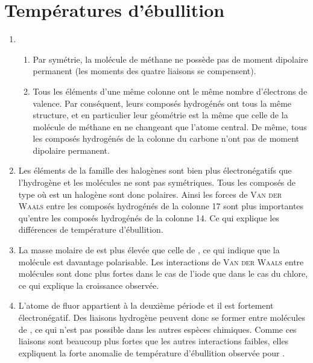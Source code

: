 \documentclass[a4paper, 12pt, final, garamond]{book}
\begin{document}
\section{Températures d'ébullition}
\begin{enumerate}
    \item 
        \begin{enumerate}
            \item Par symétrie, la molécule de méthane ne possède pas de moment
                dipolaire permanent (les moments des quatre liaisons  se
                compensent).
            \item Tous les éléments d'une même colonne ont le même nombre
                d'électrons de valence. Par conséquent, leurs composés
                hydrogénés ont tous la même structure, et en particulier leur
                géométrie est la même que celle de la molécule de méthane en ne
                changeant que l'atome central. De même, tous les composés
                hydrogénés de la colonne du carbone n'ont pas de moment
                dipolaire permanent.
        \end{enumerate}
    \item Les éléments de la famille des halogènes sont bien plus
        électronégatifs que l'hydrogène et les molécules ne sont pas
        symétriques. Tous les composés de type  où  est un
        halogène sont donc polaires. Ainsi les forces de \textsc{Van der Waals}
        entre les composés hydrogénés de la colonne 17 sont plus importantes
        qu'entre les composés hydrogénés de la colonne 14. Ce qui explique les
        différences de température d'ébullition.
    \item La masse molaire de  est plus élevée que celle de , ce
        qui indique que la molécule est davantage polarisable. Les interactions
        de \textsc{Van der Waals} entre molécules sont donc plus fortes dans le
        cas de l'iode que dans le cas du chlore, ce qui explique la croissance
        observée.
    \item L'atome de fluor appartient à la deuxième période et il est fortement
        électronégatif. Des liaisons hydrogène peuvent donc se former entre
        molécules de , ce qui n'est pas possible dans les autres espèces
        chimiques. Comme ces liaisons sont beaucoup plus fortes que les autres
        interactions faibles, elles expliquent la forte anomalie de température
        d'ébullition observée pour .
\end{enumerate}
\end{document}
